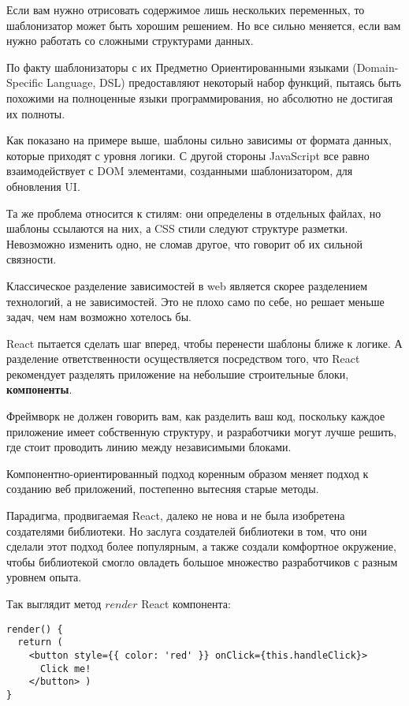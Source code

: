 Если вам нужно отрисовать содержимое лишь нескольких переменных, то шаблонизатор может быть хорошим решением. Но все сильно меняется, если вам нужно работать со сложными структурами данных.

По факту шаблонизаторы с их Предметно Ориентированными языками (Domain-Specific Language, DSL) предоставляют некоторый набор функций, пытаясь быть похожими на полноценные языки программирования, но абсолютно не достигая их полноты.

Как показано на примере выше, шаблоны сильно зависимы от формата данных, которые приходят с уровня логики. С другой стороны JavaScript все равно взаимодействует с DOM элементами, созданными шаблонизатором, для обновления UI. 

Та же проблема относится к стилям: они определены в отдельных файлах, но шаблоны ссылаются на них, а CSS стили следуют структуре разметки. Невозможно изменить одно, не сломав другое, что говорит об их сильной связности.

Классическое разделение зависимостей в web является скорее разделением технологий, а не зависимостей. Это не плохо само по себе, но решает меньше задач, чем нам возможно хотелось бы.

React пытается сделать шаг вперед, чтобы перенести шаблоны ближе к логике. А разделение ответственности осуществляется посредством того, что React рекомендует разделять приложение на небольшие строительные блоки, \textbf{компоненты}.

Фреймворк не должен говорить вам, как разделить ваш код, поскольку каждое приложение имеет собственную структуру, и разработчики могут лучше решить, где стоит проводить линию между независимыми блоками.

Компонентно-ориентированный подход коренным образом меняет подход к созданию веб приложений, постепенно вытесняя старые методы.

Парадигма, продвигаемая React, далеко не нова и не была изобретена создателями библиотеки. Но заслуга создателей библиотеки в том, что они сделали этот подход более популярным, а также создали комфортное окружение, чтобы библиотекой смогло овладеть большое множество разработчиков с разным уровнем опыта.

Так выглядит метод $render$ React компонента:

\begin{lstlisting}
render() {
  return (
    <button style={{ color: 'red' }} onClick={this.handleClick}>
      Click me!
    </button> )
}
\end{lstlisting}

